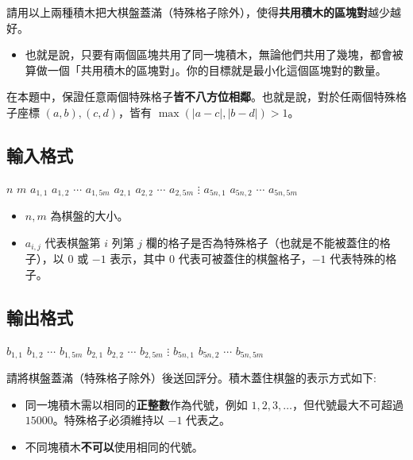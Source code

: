 請用以上兩種積木把大棋盤蓋滿（特殊格子除外），使得\textbf{共用積木的區塊對}越少越好。

\begin{itemize}
\tightlist
\item
  也就是說，只要有兩個區塊共用了同一塊積木，無論他們共用了幾塊，都會被算做一個「共用積木的區塊對」。你的目標就是最小化這個區塊對的數量。
\end{itemize}

在本題中，保證任意兩個特殊格子\textbf{皆不八方位相鄰}。也就是說，對於任兩個特殊格子座標
\((a, b), (c, d)\)，皆有 \(\max(|a - c|, |b - d|) > 1\)。

\subsection{輸入格式}

\begin{format}
\f{
$n$ $m$
$a_{1, 1}$ $a_{1, 2}$ $\cdots$ $a_{1, 5m}$
$a_{2, 1}$ $a_{2, 2}$ $\cdots$ $a_{2, 5m}$
$\vdots$
$a_{5n, 1}$ $a_{5n, 2}$ $\cdots$ $a_{5n, 5m}$
}
\end{format}

\begin{itemize}
\tightlist
\item
  \(n, m\) 為棋盤的大小。
\item
  \(a_{i, j}\) 代表棋盤第 \(i\) 列第 \(j\)
  欄的格子是否為特殊格子（也就是不能被蓋住的格子），以 \(0\) 或 \(-1\)
  表示，其中 \(0\) 代表可被蓋住的棋盤格子，\(-1\) 代表特殊的格子。
\end{itemize}

\subsection{輸出格式}

\begin{format}
\f{
$b_{1, 1}$ $b_{1, 2}$ $\cdots$ $b_{1, 5m}$
$b_{2, 1}$ $b_{2, 2}$ $\cdots$ $b_{2, 5m}$
$\vdots$
$b_{5n, 1}$ $b_{5n, 2}$ $\cdots$ $b_{5n, 5m}$
}
\end{format}

請將棋盤蓋滿（特殊格子除外）後送回評分。積木蓋住棋盤的表示方式如下:

\begin{itemize}
\tightlist
\item
  同一塊積木需以相同的\textbf{正整數}作為代號，例如
  \(1, 2, 3, \ldots\)，但代號最大不可超過 \(15000\)。特殊格子必須維持以
  \(-1\) 代表之。
\item
  不同塊積木\textbf{不可以}使用相同的代號。
\end{itemize}

